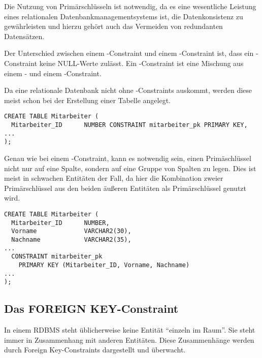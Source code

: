         Die Nutzung von Primärschlüsseln ist notwendig, da es eine wesentliche Leistung eines relationalen Datenbankmanagementsystems ist, die Datenkonsistenz zu gewährleisten und hierzu gehört auch das Vermeiden von redundanten Datensätzen.

        \begin{merke}
          Der Unterschied zwischen einem \UNIQUE-Constraint und einem \PRIMARYKEY-Constraint ist, dass ein \PRIMARYKEY-Constraint keine NULL-Werte zulässt. Ein \PRIMARYKEY-Constraint ist eine Mischung aus einem \NOTNULL- und einem \UNIQUE-Constraint.
        \end{merke}
        Da eine relationale Datenbank nicht ohne \PRIMARYKEY-Constraints
        auskommt, werden diese meist schon bei der Erstellung einer Tabelle
        angelegt.

        \begin{lstlisting}[language=oracle_sql,caption={Ein PRIMARY KEY-Constraint als Inline Constraint anlegen},label=sql09_13]
CREATE TABLE Mitarbeiter (
  Mitarbeiter_ID      NUMBER CONSTRAINT mitarbeiter_pk PRIMARY KEY,
...
);
        \end{lstlisting}
        Genau wie bei einem \UNIQUE-Constraint, kann es notwendig sein, einen Primäschlüssel nicht nur auf eine Spalte, sondern auf eine Gruppe von Spalten zu legen. Dies ist meist in schwachen Entitäten der Fall, da hier die Kombination zweier Primärschlüssel aus den beiden äußeren Entitäten als Primärschlüssel genutzt wird.
        \begin{lstlisting}[language=oracle_sql,caption={Ein PRIMARY KEY-Constraint als Out Of Line Constraint auf mehrere Spalten anlegen},label=sql09_14]
CREATE TABLE Mitarbeiter (
  Mitarbeiter_ID      NUMBER,
  Vorname             VARCHAR2(30),
  Nachname            VARCHAR2(35),
...
  CONSTRAINT mitarbeiter_pk
    PRIMARY KEY (Mitarbeiter_ID, Vorname, Nachname)
...
);
        \end{lstlisting}
      \subsection{Das FOREIGN KEY-Constraint}
        \label{refint}
        In einem RDBMS steht üblicherweise keine Entität \enquote{einzeln im Raum}. Sie steht immer in Zusammenhang mit anderen Entitäten. Diese Zusammenhänge werden durch Foreign Key-Constraints dargestellt und überwacht.

